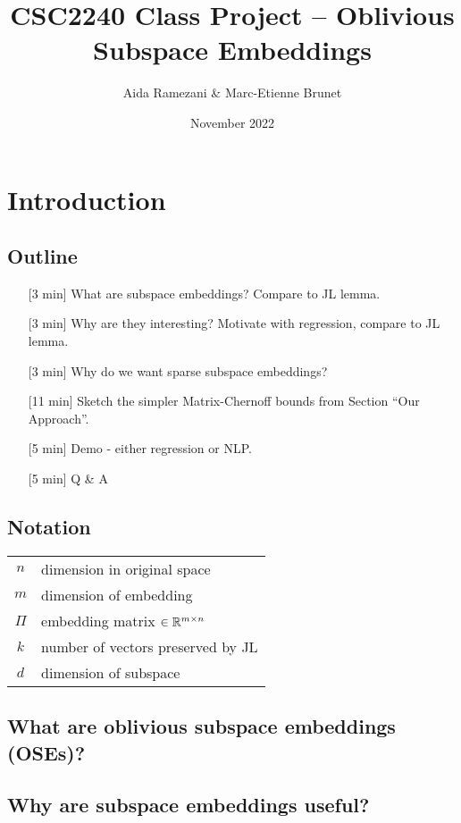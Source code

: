 \documentclass{article}
\title{CSC2240 Class Project -- Oblivious Subspace Embeddings}
\author{Aida Ramezani \& Marc-Etienne Brunet}
\date{November 2022}
\begin{document}
\maketitle

\section{Introduction}
\subsection{Outline}
\begin{enumerate}
    \item [{[}3 min{]}] What are subspace embeddings? Compare to JL lemma.
    \item [{[}3 min{]}] Why are they interesting? Motivate with regression, compare to JL lemma. 
    \item [{[}3 min{]}] Why do we want sparse subspace embeddings?
    \item [{[}11 min{]}] Sketch the simpler Matrix-Chernoff bounds from Section ``Our Approach''.
    \item [{[}5 min{]}] Demo - either regression or NLP. 
    \item [{[}5 min{]}] Q \& A
\end{enumerate}

\subsection{Notation}
\begin{tabular}{c|l}
    $n$ & dimension in original space \\
    $m$ & dimension of embedding \\
    $\Pi$ & embedding matrix $\in \mathbb R^{m \times n}$ \\
    $k$ & number of vectors preserved by JL \\
    $d$ & dimension of subspace \\
\end{tabular}

\subsection{What are oblivious subspace embeddings (OSEs)?}



\subsection{Why are subspace embeddings useful?}

\end{document}
